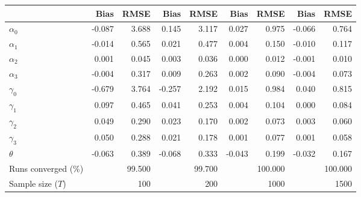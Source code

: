
\begin{tabular}[t]{lrrrrrrrr}
\toprule
  & Bias & RMSE & Bias & RMSE & Bias & RMSE & Bias & RMSE\\
\midrule
$\alpha_{0}$ & -0.087 & 3.688 & 0.145 & 3.117 & 0.027 & 0.975 & -0.066 & 0.764\\
$\alpha_{1}$ & -0.014 & 0.565 & 0.021 & 0.477 & 0.004 & 0.150 & -0.010 & 0.117\\
$\alpha_{2}$ & 0.001 & 0.045 & 0.003 & 0.036 & 0.000 & 0.012 & -0.001 & 0.010\\
$\alpha_{3}$ & -0.004 & 0.317 & 0.009 & 0.263 & 0.002 & 0.090 & -0.004 & 0.073\\
$\gamma_{0}$ & -0.679 & 3.764 & -0.257 & 2.192 & 0.015 & 0.984 & 0.040 & 0.815\\
$\gamma_{1}$ & 0.097 & 0.465 & 0.041 & 0.253 & 0.004 & 0.104 & 0.000 & 0.084\\
$\gamma_{2}$ & 0.049 & 0.290 & 0.023 & 0.170 & 0.002 & 0.073 & 0.003 & 0.060\\
$\gamma_{3}$ & 0.050 & 0.288 & 0.021 & 0.178 & 0.001 & 0.077 & 0.001 & 0.058\\
$\theta$ & -0.063 & 0.389 & -0.068 & 0.333 & -0.043 & 0.199 & -0.032 & 0.167\\
Runs converged (\%) &  & 99.500 &  & 99.700 &  & 100.000 &  & 100.000\\
Sample size ($T$) &  & 100 &  & 200 &  & 1000 &  & 1500\\
\bottomrule
\end{tabular}
